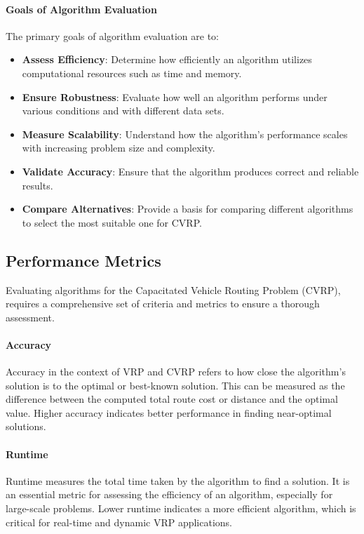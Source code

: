 \documentclass[
]{article}
\begin{document}
    \paragraph{Goals of Algorithm Evaluation}
    The primary goals of algorithm evaluation are to:
    \begin{itemize}
        \item \textbf{Assess Efficiency}: Determine how efficiently an algorithm utilizes computational resources such as time and memory.
        \item \textbf{Ensure Robustness}: Evaluate how well an algorithm performs under various conditions and with different data sets.
        \item \textbf{Measure Scalability}: Understand how the algorithm's performance scales with increasing problem size and complexity.
        \item \textbf{Validate Accuracy}: Ensure that the algorithm produces correct and reliable results.
        \item \textbf{Compare Alternatives}: Provide a basis for comparing different algorithms to select the most suitable one for CVRP.
    \end{itemize}

    \subsection{Performance Metrics}
    \label{subsubsec:performance_metrics}
    Evaluating algorithms for the Capacitated Vehicle Routing Problem (CVRP), requires a comprehensive set of criteria and metrics to ensure a thorough assessment.

    \paragraph{Accuracy} Accuracy in the context of VRP and CVRP refers to how close the algorithm’s solution is to the optimal or best-known solution. This can be measured as the difference between the computed total route cost or distance and the optimal value. Higher accuracy indicates better performance in finding near-optimal solutions.

    \paragraph{Runtime} Runtime measures the total time taken by the algorithm to find a solution. It is an essential metric for assessing the efficiency of an algorithm, especially for large-scale problems. Lower runtime indicates a more efficient algorithm, which is critical for real-time and dynamic VRP applications.
\end{document}
